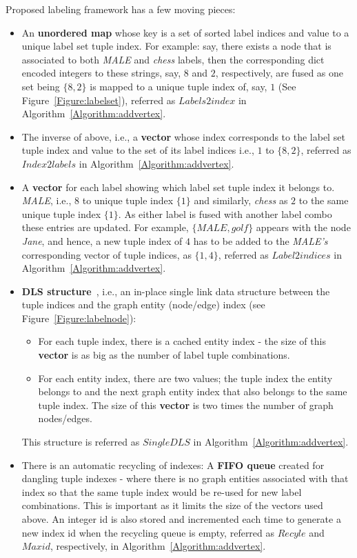 \documentclass[preprint,3p,twocolumn]{elsarticle}
\begin{document}
Proposed labeling framework has a few moving pieces:
\begin{itemize}
\item An \textbf{unordered map} whose key is a set of sorted label indices and value to a unique label set tuple index. For example: say, there exists a node that is associated to both \textit{MALE} and \textit{chess} labels, then the corresponding dict encoded integers to these strings, say, $8$ and $2$, respectively, are fused as one set being $\{8,2\}$ is mapped to a unique tuple index of, say, $1$ (See Figure~\ref{Figure:labelset}), referred as $Labels2index$ in Algorithm~\ref{Algorithm:addvertex}.
\item The inverse of above, i.e., a \textbf{vector} whose index corresponds to the label set tuple index and value to the set of its label indices i.e., $1$ to $\{8,2\}$, referred as $Index2labels$ in Algorithm~\ref{Algorithm:addvertex}.
\item A \textbf{vector} for each label showing which label set tuple index it belongs to. \textit{MALE}, i.e., $8$ to unique tuple index $\{1\}$ and similarly, \textit{chess} as $2$ to the same unique tuple index $\{1\}$. As either label is fused with another label combo these entries are updated. For example, $\{MALE,golf\}$ appears with the node \textit{Jane}, and hence, a new tuple index of $4$ has to be added to the \textit{MALE's} corresponding vector of tuple indices, as $\{1,4\}$, referred as $Label2indices$ in Algorithm~\ref{Algorithm:addvertex}.
\item \textbf{DLS structure}~\cite{dls}, i.e., an in-place single link data structure between the tuple indices and the graph entity (node/edge) index  (see Figure~\ref{Figure:labelnode}): 
\begin{itemize}
 \item For each tuple index, there is a cached entity index - the size of this \textbf{vector} is as big as the number of label tuple combinations.
 \item For each entity index, there are two values; the tuple index the entity belongs to and the next graph entity index that also belongs to the same tuple  index. The size of this \textbf{vector} is two times the number of graph nodes/edges.
\end{itemize}
This structure is referred as $SingleDLS$ in Algorithm~\ref{Algorithm:addvertex}.
\item There is an automatic recycling of indexes: A \textbf{FIFO queue} created for dangling tuple indexes - where there is no graph entities associated with that index so that the same tuple index would be re-used for new label combinations. This is important as it limits the size of the vectors used above. An integer id is also stored and incremented each time to generate a new index id when the recycling queue is empty, referred as $Recyle$ and $Maxid$, respectively, in Algorithm~\ref{Algorithm:addvertex}.
\end{itemize}
\end{document}
